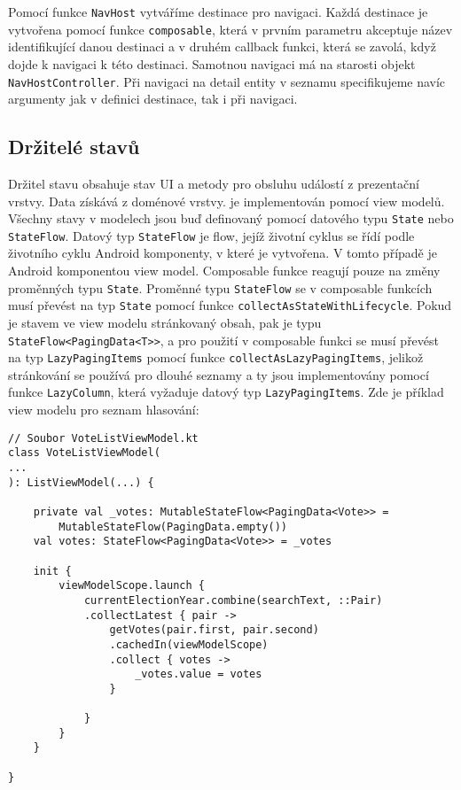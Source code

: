 \noindent Pomocí funkce \lstinline|NavHost| vytváříme destinace pro navigaci. Každá destinace je vytvořena pomocí funkce \lstinline|composable|, která v prvním parametru akceptuje název identifikující danou destinaci a v druhém callback funkci, která se zavolá,  když dojde k navigaci k této destinaci. Samotnou navigaci má na starosti objekt \lstinline|NavHostController|. Při navigaci na detail entity v seznamu specifikujeme navíc argumenty jak v definici destinace, tak i při navigaci.

\subsection*{Držitelé stavů}
Držitel stavu obsahuje stav UI a metody pro obsluhu událostí z prezentační vrstvy. Data získává z doménové vrstvy. je implementován pomocí view modelů. Všechny stavy v modelech jsou buď definovaný pomocí datového typu \lstinline|State| nebo \lstinline|StateFlow|. Datový typ \lstinline|StateFlow| je flow, jejíž životní cyklus se řídí podle životního cyklu Android komponenty, v které je vytvořena. V tomto případě je Android komponentou view model. Composable funkce reagují pouze na změny proměnných typu \lstinline|State|. Proměnné typu \lstinline|StateFlow| se v composable funkcích musí převést na typ \lstinline|State| pomocí funkce \lstinline|collectAsStateWithLifecycle|. Pokud je stavem ve view modelu stránkovaný obsah, pak je typu \lstinline|StateFlow<PagingData<T>>|, a pro použití v composable funkci se musí převést na typ \lstinline|LazyPagingItems| pomocí funkce \linebreak \lstinline|collectAsLazyPagingItems|, jelikož stránkování se používá pro dlouhé seznamy a ty jsou implementovány pomocí funkce \lstinline|LazyColumn|, která vyžaduje datový typ \lstinline|LazyPagingItems|. Zde je příklad view modelu pro seznam hlasování:

\begin{lstlisting}[caption={Ukázka využití view modelu}, label={lst:view-model}, tabsize=2]
// Soubor VoteListViewModel.kt
class VoteListViewModel(
...
): ListViewModel(...) {
	
	private val _votes: MutableStateFlow<PagingData<Vote>> =
		MutableStateFlow(PagingData.empty())
	val votes: StateFlow<PagingData<Vote>> = _votes
	
	init {
		viewModelScope.launch {
			currentElectionYear.combine(searchText, ::Pair)
			.collectLatest { pair ->
				getVotes(pair.first, pair.second)
				.cachedIn(viewModelScope)
				.collect { votes ->
					_votes.value = votes
				}
				
			}
		}
	}
	
}
\end{lstlisting}

